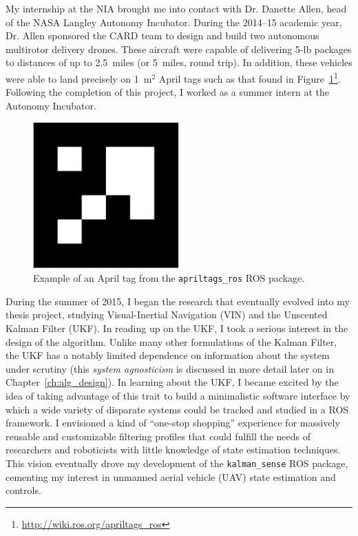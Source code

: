 My internship at the NIA brought me into contact with Dr. Danette Allen, head of the NASA Langley Autonomy Incubator. During the 2014--15 academic year, Dr. Allen sponsored the CARD team to design and build two autonomous multirotor delivery drones. These aircraft were capable of delivering 5-lb packages to distances of up to 2.5~miles (or 5~miles, round trip). In addition, these vehicles were able to land precisely on 1~m$^2$ April tags such as that found in Figure~\ref{fig:april_tag}\footnote{\url{http://wiki.ros.org/apriltags\_ros}}. Following the completion of this project, I worked as a summer intern at the Autonomy Incubator.

\begin{figure}
  \centering
    \includegraphics[width=0.5\textwidth]{april_tag}
  \caption[Example April tag]{Example of an April tag from the \texttt{apriltags\_ros} ROS package.}
  \label{fig:april_tag}
\end{figure}

During the summer of 2015, I began the research that eventually evolved into my thesis project, studying Visual-Inertial Navigation (VIN) and the Unscented Kalman Filter (UKF). In reading up on the UKF, I took a serious interest in the design of the algorithm. Unlike many other formulations of the Kalman Filter, the UKF has a notably limited dependence on information about the system under scrutiny (this \textit{system agnosticism} is discussed in more detail later on in Chapter~\ref{ch:alg_design}). In learning about the UKF, I became excited by the idea of taking advantage of this trait to build a minimalistic software interface by which a wide variety of disparate systems could be tracked and studied in a ROS framework. I envisioned a kind of ``one-stop shopping'' experience for massively reusable and customizable filtering profiles that could fulfill the needs of researchers and roboticists with little knowledge of state estimation techniques. This vision eventually drove my development of the \texttt{kalman\_sense} ROS package, cementing my interest in unmanned aerial vehicle (UAV) state estimation and controls.

